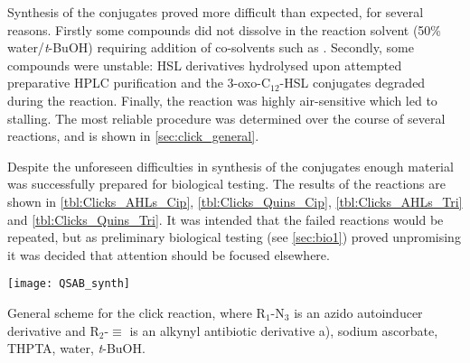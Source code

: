 Synthesis of the conjugates proved more difficult than expected, for several reasons. Firstly some compounds did not dissolve in the reaction solvent (50\% water/\textit{t}-BuOH) requiring addition of co-solvents such as . Secondly, some compounds were unstable: HSL derivatives hydrolysed upon attempted preparative HPLC purification and the 3-oxo-C$_{12}$-HSL conjugates degraded during the reaction. Finally, the reaction was highly air-sensitive which led to stalling. 
The most reliable procedure was determined over the course of several reactions, and is shown in \ref{sec:click_general}. 

Despite the unforeseen difficulties in synthesis of the conjugates enough material was successfully prepared for biological testing. The results of the reactions are shown in \ref{tbl:Clicks_AHLs_Cip}, \ref{tbl:Clicks_Quins_Cip}, \ref{tbl:Clicks_AHLs_Tri} and \ref{tbl:Clicks_Quins_Tri}. It was intended that the failed reactions would be repeated, but as preliminary biological testing (see \ref{sec:bio1}) proved unpromising it was decided that attention should be focused elsewhere.


\begin{scheme}[H]
	\begin{center}
		\texttt{[image: QSAB\_synth]}
		\caption{General scheme for the click reaction, where R$_1$-N$_3$ is an azido autoinducer derivative and R$_2$-$\equiv$ is an alkynyl antibiotic derivative a), sodium ascorbate, THPTA, water, \textit{t}-BuOH.\label{sch:QSAB_synth}} 
	\end{center}
\end{scheme}

